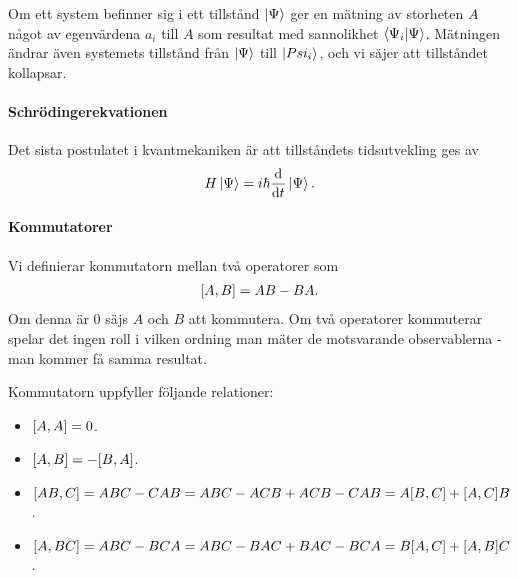 Om ett system befinner sig i ett tillstånd $\ket{\Psi}$ ger en mätning av storheten $A$ något av egenvärdena $a_{i}$ till $A$ som resultat med sannolikhet $\braket{\Psi_{i}}{\Psi}$. Mätningen ändrar även systemets tillstånd från $\ket{\Psi}$ till $\ket{Psi_{i}}$, och vi säjer att tillståndet kollapsar.

\paragraph{Schrödingerekvationen}
Det sista postulatet i kvantmekaniken är att tillståndets tidsutvekling ges av
\begin{align*}
	H\ket{\Psi} = i\hbar\dv{t}\ket{\Psi}.
\end{align*}

\paragraph{Kommutatorer}
Vi definierar kommutatorn mellan två operatorer som
\begin{align*}
	[A, B] = AB - BA.
\end{align*}
Om denna är $0$ säjs $A$ och $B$ att kommutera. Om två operatorer kommuterar spelar det ingen roll i vilken ordning man mäter de motsvarande observablerna - man kommer få samma resultat.

Kommutatorn uppfyller följande relationer:
\begin{itemize}
	\item $[A, A] = 0$.
	\item $[A, B] = -[B, A]$.
	\item $[AB, C] = ABC - CAB = ABC - ACB + ACB - CAB = A[B, C] + [A, C]B$.
	\item $[A, BC] = ABC - BCA = ABC - BAC + BAC - BCA = B[A, C] + [A, B]C$.
\end{itemize}

